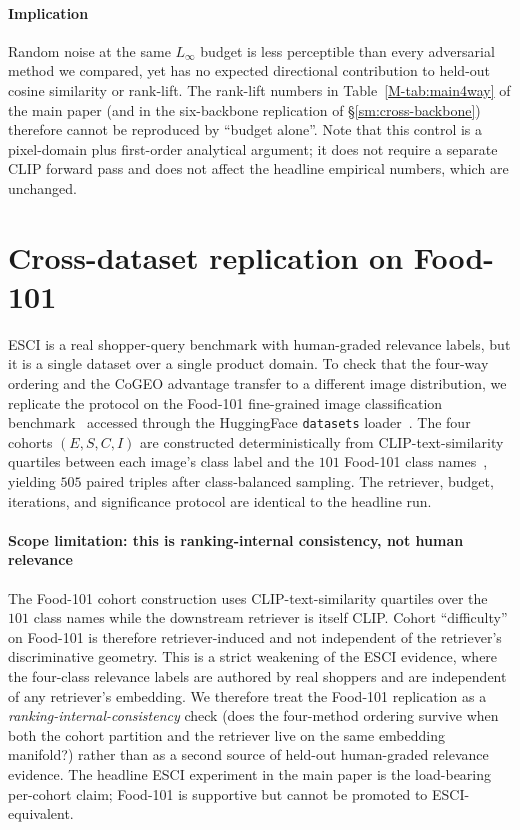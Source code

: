 \paragraph{Implication} Random noise at the same $L_\infty$ budget is less perceptible than every adversarial method we compared, yet has no expected directional contribution to held-out cosine similarity or rank-lift. The rank-lift numbers in Table~\ref{M-tab:main4way} of the main paper (and in the six-backbone replication of \S\ref{sm:cross-backbone}) therefore cannot be reproduced by ``budget alone''. Note that this control is a pixel-domain plus first-order analytical argument; it does not require a separate CLIP forward pass and does not affect the headline empirical numbers, which are unchanged.

\section{Cross-dataset replication on Food-101}
\label{sm:cross-dataset}

ESCI is a real shopper-query benchmark with human-graded relevance labels, but it is a single dataset over a single product domain. To check that the four-way ordering and the CoGEO advantage transfer to a different image distribution, we replicate the protocol on the Food-101 fine-grained image classification benchmark~\cite{bossard2014food101} accessed through the HuggingFace \texttt{datasets} loader~\cite{lhoest2021datasets}. The four cohorts $(E, S, C, I)$ are constructed deterministically from CLIP-text-similarity quartiles between each image's class label and the $101$ Food-101 class names~\cite{radford2021clip}, yielding $505$ paired triples after class-balanced sampling. The retriever, budget, iterations, and significance protocol are identical to the headline run.

\paragraph{Scope limitation: this is ranking-internal consistency, not human relevance} The Food-101 cohort construction uses CLIP-text-similarity quartiles over the $101$ class names while the downstream retriever is itself CLIP. Cohort ``difficulty'' on Food-101 is therefore retriever-induced and not independent of the retriever's discriminative geometry. This is a strict weakening of the ESCI evidence, where the four-class relevance labels are authored by real shoppers and are independent of any retriever's embedding. We therefore treat the Food-101 replication as a \emph{ranking-internal-consistency} check (does the four-method ordering survive when both the cohort partition and the retriever live on the same embedding manifold?) rather than as a second source of held-out human-graded relevance evidence. The headline ESCI experiment in the main paper is the load-bearing per-cohort claim; Food-101 is supportive but cannot be promoted to ESCI-equivalent.

